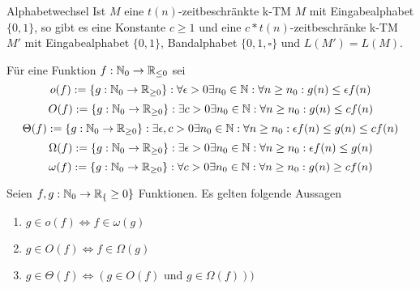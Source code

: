 \begin{satz}{Alphabetwechsel}
	Ist $M$ eine $t(n)$-zeitbeschränkte k-TM $M$ mit Eingabealphabet $\{0, 1 \}$, so gibt es eine Konstante $c \geq 1$ und eine $c * t(n)$-zeitbeschränke k-TM $M'$ mit Eingabealphabet $\{0, 1\}$, Bandalphabet $\{0, 1, \square\}$ und $L(M') = L(M)$.
\end{satz}

\begin{defn}{}
	Für eine Funktion $f : \mathbb{N}_0 \to \mathbb{R}_{\leq 0}$ sei
	$$ o(f) := \{g : \mathbb{N}_0 \to \mathbb{R}_{\geq 0}\} : \forall \epsilon > 0 \exists n_0 \in \mathbb{N} : \forall n \geq n_0 : g(n) \leq \epsilon f(n) $$
		$$ O(f) := \{g : \mathbb{N}_0 \to \mathbb{R}_{\geq 0}\} : \exists c > 0 \exists n_0 \in \mathbb{N} : \forall n \geq n_0 : g(n) \leq c f(n) $$
		$$ \Theta(f) := \{g : \mathbb{N}_0 \to \mathbb{R}_{\geq 0}\} : \exists\epsilon, c > 0 \exists n_0 \in \mathbb{N} : \forall n \geq n_0 : \epsilon f(n) \leq g(n) \leq c f(n) $$
		$$ \Omega(f) := \{g : \mathbb{N}_0 \to \mathbb{R}_{\geq 0}\} : \exists\epsilon > 0 \exists n_0 \in \mathbb{N} : \forall n \geq n_0 : \epsilon f(n) \leq g(n) $$
		$$ \omega(f) := \{g : \mathbb{N}_0 \to \mathbb{R}_{\geq 0}\} : \forall c > 0 \exists n_0 \in \mathbb{N} : \forall n \geq n_0 : g(n) \geq c f(n) $$
		
\end{defn}

\begin{bem}
	Seien $f, g : \mathbb{N}_0 \to \mathbb{R}_\{\geq 0\}$ Funktionen. Es gelten folgende Aussagen
	\begin{enumerate}[label=(\roman*)]
    		\item $g \in o(f) \iff f \in \omega(g)$
    		\item $g \in O(f) \iff f \in \Omega(g)$
	    	\item $g \in \Theta(f) \iff (g \in O(f) \text{ und } g \in \Omega(f))) $
	\end{enumerate}
\end{bem}

